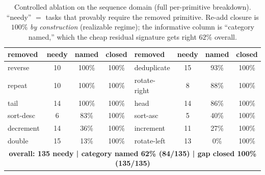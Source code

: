 \begin{table}[t]\centering
\caption{Controlled ablation on the sequence domain (full per-primitive breakdown). ``needy'' $=$ tasks that
provably require the removed primitive. Re-add closure is $100\%$ \emph{by construction} (realizable regime);
the informative column is ``category named,'' which the cheap residual signature gets right $62\%$ overall.}
\label{tab:ablation}
\small
\begin{tabular}{lccc|lccc}
\toprule
removed & needy & named & closed & removed & needy & named & closed \\
\midrule
reverse & 10 & 100\% & 100\% & deduplicate & 15 & 93\% & 100\% \\
repeat & 10 & 100\% & 100\% & rotate-right & 8 & 88\% & 100\% \\
tail & 14 & 100\% & 100\% & head & 14 & 86\% & 100\% \\
sort-desc & 6 & 83\% & 100\% & sort-asc & 5 & 40\% & 100\% \\
decrement & 14 & 36\% & 100\% & increment & 11 & 27\% & 100\% \\
double & 15 & 13\% & 100\% & rotate-left & 13 & 0\% & 100\% \\
\midrule
\multicolumn{8}{c}{\textbf{overall: 135 needy \;|\; category named 62\% (84/135) \;|\; gap closed 100\% (135/135)}}\\
\bottomrule
\end{tabular}
\end{table}
